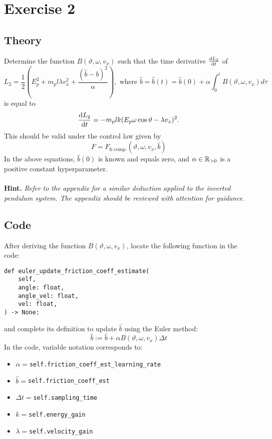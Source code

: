 \documentclass[12pt]{article}
\begin{document}
\section*{Exercise 2}

\subsection*{Theory}
Determine the function $B(\vartheta, \omega, v_x)$ such that the time derivative $\frac{\mathop{}\!\mathrm{d} L_2}{\mathop{}\!\mathrm{d} t}$ of
$$
L_2 = \frac{1}{2}\left(E_p^2 + m_p l\lambda v_x ^ 2 + \frac{(\hat{b} - b) ^ 2}{\alpha}\right), \text{ where } \hat{b} = \hat{b}(t) = \hat{b}(0) + \alpha\int_{0}^{t} B(\vartheta, \omega, v_x) d \tau
$$
is equal to
$$
\frac{\mathop{}\!\mathrm{d} L_2}{\mathop{}\!\mathrm{d} t} = - m_p lk (E_p\omega \cos \vartheta  - \lambda v_x)^2.
$$
This should be valid under the control law given by
$$
    F = F_{\text{fr.comp.}}(\vartheta, \omega, v_x, \hat{b})
$$
In the above equations, $\hat{b}(0)$ is known and equals zero, and  $\alpha \in {\mathbb{R}}_{>0}$ is a positive constant hyperparameter.
\\
\\
\textbf{Hint.} \textit{Refer to the appendix for a similar deduction applied to the inverted pendulum system. The appendix should be reviewed with attention for guidance.}  

\subsection*{Code}
After deriving the function $B(\vartheta, \omega, v_x)$, locate the following function in the code:
\begin{verbatim}
def euler_update_friction_coeff_estimate(
    self,
    angle: float, 
    angle_vel: float, 
    vel: float,
) -> None:
\end{verbatim}
and complete its definition to update $\hat{b}$ using the Euler method:
\begin{equation*}
    \hat{b} := \hat{b} + \alpha B(\vartheta, \omega, v_x) \Delta t
\end{equation*}
In the code, variable notation corresponds to:
\begin{itemize}
    \item $\alpha=$\texttt{self.friction\_coeff\_est\_learning\_rate}
    \item $\hat{b} =$\texttt{self.friction\_coeff\_est}
    \item $\Delta t =$\texttt{self.sampling\_time}
    \item $k=$\texttt{self.energy\_gain}
    \item $\lambda=$\texttt{self.velocity\_gain}
\end{itemize}
\end{document}
